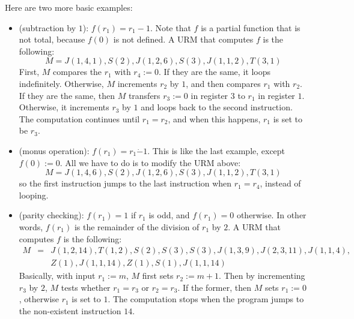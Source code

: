 \documentclass[12pt]{article}
\begin{document}
Here are two more basic examples:

\begin{itemize}
\item (subtraction by $1$): $f(r_1)=r_1-1$.  Note that $f$ is a partial function that is not total, because $f(0)$ is not defined.  A URM that computes $f$ is the following:
$$M = J(1,4,1),S(2),J(1,2,6),S(3),J(1,1,2),T(3,1) $$
First, $M$ compares the $r_1$ with $r_4:=0$.  If they are the same, it loops indefinitely.  Otherwise, $M$ increments $r_2$ by $1$, and then compares $r_1$ with $r_2$.  If they are the same, then $M$ transfers $r_3:=0$ in register $3$ to $r_1$ in register $1$.  Otherwise, it increments $r_3$ by $1$ and loops back to the second instruction.  The computation continues until $r_1=r_2$, and when this happens, $r_1$ is set to be $r_3$.

\item (monus operation): $f(r_1)=r_1 \dot{-} 1$.  This is like the last example, except $f(0):=0$.  All we have to do is to modify the URM above:
$$M = J(1,4,6),S(2),J(1,2,6),S(3),J(1,1,2),T(3,1) $$
so the first instruction jumps to the last instruction when $r_1=r_4$, instead of looping.
\item (parity checking): $f(r_1)=1$ if $r_1$ is odd, and $f(r_1)=0$ otherwise.  In other words, $f(r_1)$ is the remainder of the division of $r_1$ by $2$.  A URM that computes $f$ is the following:
\begin{eqnarray*}
M &=& J(1,2,14),T(1,2),S(2),S(3),S(3),J(1,3,9),J(2,3,11),J(1,1,4),\\
&& Z(1),J(1,1,14),Z(1),S(1),J(1,1,14)
\end{eqnarray*}
Basically, with input $r_1:=m$, $M$ first sets $r_2:=m+1$.  Then by incrementing $r_3$ by $2$, $M$ tests whether $r_1=r_3$ or $r_2=r_3$.  If the former, then $M$ sets $r_1:=0$, otherwise $r_1$ is set to $1$.  The computation stops when the program jumps to the non-existent instruction $14$.
\end{itemize}
\end{document}
